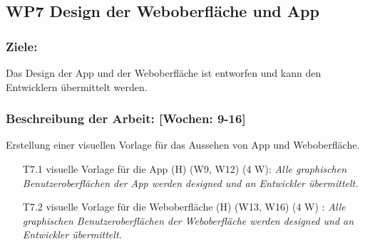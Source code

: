 \documentclass{scrreprt}
\begin{document}
\subsection*{WP7 Design der Weboberfläche und App}

\subsubsection{Ziele:} Das Design der App und der Weboberfläche ist entworfen und kann den Entwicklern übermittelt werden.
\subsubsection{Beschreibung der Arbeit: [Wochen: 9-16]} Erstellung einer visuellen Vorlage für das Aussehen von App und Weboberfläche. 

\begin{enumerate}
\item [T7.1] visuelle Vorlage für die App (H) (W9, W12) (4 W): \emph{ Alle graphischen Benutzeroberflächen der App werden designed und an Entwickler übermittelt.}
\item [T7.2] visuelle Vorlage für die Weboberfläche (H) (W13, W16) (4 W) : \emph{ Alle graphischen Benutzeroberflächen der Weboberfläche werden designed und an Entwickler übermittelt.}
\end{enumerate}
\end{document}
